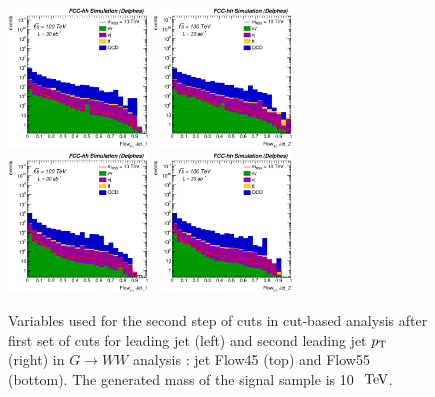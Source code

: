 \documentclass{cernrep}
\begin{document}
\begin{figure}[!htb]\centering
\includegraphics[width=0.33\textwidth]{Fig/RSGww/Jet1_Flow45_sel1_nostack_log.eps}
\includegraphics[width=0.33\textwidth]{Fig/RSGww/Jet2_Flow45_sel1_nostack_log.eps}
\includegraphics[width=0.33\textwidth]{Fig/RSGww/Jet1_Flow55_sel1_nostack_log.eps}
\includegraphics[width=0.33\textwidth]{Fig/RSGww/Jet2_Flow55_sel1_nostack_log.eps}
\caption{Variables used for the second step of cuts in cut-based analysis after first set of cuts for leading jet (left) and second leading jet $p\sb{\scriptstyle\mathrm{T}}$ (right) in $G \rightarrow WW$ analysis : jet Flow45 (top) and Flow55 (bottom). The generated mass of the signal sample is 10 $\TeV$.}
\label{fig:RSGww_sel1_cut}
\end{figure}
\end{document}

